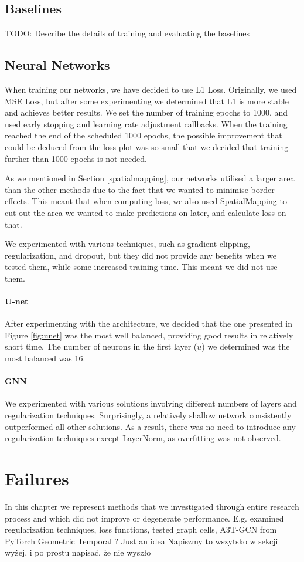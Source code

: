 \subsection{Baselines}
TODO: Describe the details of training and evaluating the baselines

\subsection{Neural Networks}
When training our networks, we have decided to use L1 Loss. Originally, we used MSE Loss, but after some experimenting we determined that L1 is more stable and achieves better results. We set the number of training epochs to 1000, and used early stopping and learning rate adjustment callbacks. When the training reached the end of the scheduled 1000 epochs, the possible improvement that could be deduced from the loss plot was so small that we decided that training further than 1000 epochs is not needed.

As we mentioned in Section \ref{spatialmapping}, our networks utilised a larger area than the other methods due to the fact that we wanted to minimise border effects. This meant that when computing loss, we also used SpatialMapping to cut out the area we wanted to make predictions on later, and calculate loss on that.

We experimented with various techniques, such as gradient clipping, regularization, and dropout, but they did not provide any benefits when we tested them, while some increased training time. This meant we did not use them.

\paragraph{U-net}
After experimenting with the architecture, we decided that the one presented in Figure \ref{fig:unet} was the most well balanced, providing good results in relatively short time. The number of neurons in the first layer ($u$) we determined was the most balanced was 16.

\paragraph{GNN}
We experimented with various solutions involving different numbers of layers and regularization techniques. Surprisingly, a relatively shallow network consistently outperformed all other solutions. As a result, there was no need to introduce any regularization techniques except LayerNorm, as overfitting was not observed.

\section{Failures}
In this chapter we represent methods that we investigated through entire research process and which did not improve or degenerate performance. E.g. examined regularization techniques, loss functions, tested graph cells, A3T-GCN \cite{zhu2020a3tgcn} from PyTorch Geometric Temporal \cite{rozemberczki2021pytorch}? Just an idea
Napiszmy to wszytsko w sekcji wyżej, i po prostu napisać, że nie wyszło
